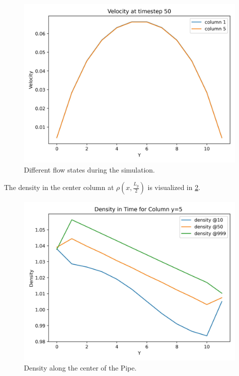 \begin{figure}[h!]
\begin{minipage}{0.33\textwidth}
    \end{minipage}%
    \begin{minipage}{0.33\textwidth}
        \includegraphics[width=\linewidth]{graphs/PoiseuilleFlow/velocity_at_columns_for_step_50}
    \end{minipage}
    \caption{
        Different flow states during the simulation.
    }
    \label{fig:pf-velocity-areas}
\end{figure}

The density in the center column at $\rho\left( x, \frac{L_y}{2} \right)$ is visualized in \cref{fig:pf-density}.
\begin{figure}[h!]
    \begin{center}
        \includegraphics[width=0.5\linewidth]{graphs/PoiseuilleFlow/density_at_column_x}
        \caption{Density along the center of the Pipe.}
        \label{fig:pf-density}
    \end{center}
\end{figure}

